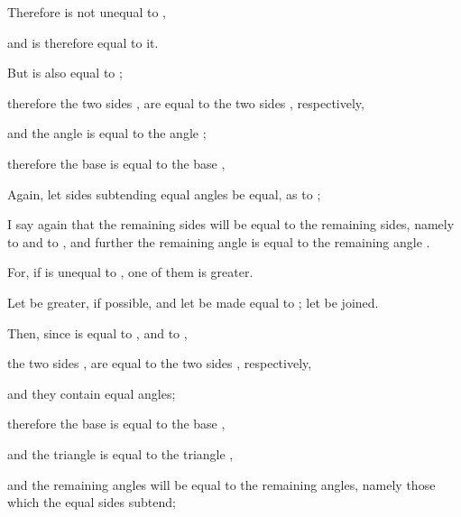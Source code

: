\documentclass[12pt, twoside]{memoir}
\begin{document}
{{    Therefore  is not unequal to , \par
    {\centering and is therefore equal to it. \par}
    But  is also equal to ; \par
therefore the two sides , are equal to the two sides , respectively, \par
	\nolinenumbers
    \clearpage
    \linenumbers
    \enlargethispage{2\baselineskip}
    and the angle  is equal to the angle ; \par
    {\centering therefore the base  is equal to the base ,\par}
    Again, let sides subtending equal angles be equal, as  to ; \par
    I say again that the remaining sides will be equal to the remaining sides, namely  to  and  to , and further the remaining angle  is equal to the remaining angle . \par
    For, if  is unequal to , one of them is greater. \par
    Let  be greater, if possible, and let  be made equal to ; let  be joined. \par
    Then, since  is equal to , and  to , \par
    {\centering the two sides , are equal to the two sides , respectively, \par}
    and they contain equal angles; \par
    {\centering therefore the base  is equal to the base , \par}
    {\centering and the triangle  is equal to the triangle , \par}
    and the remaining angles will be equal to the remaining angles, namely those which the equal sides subtend;
}}
\end{document}

